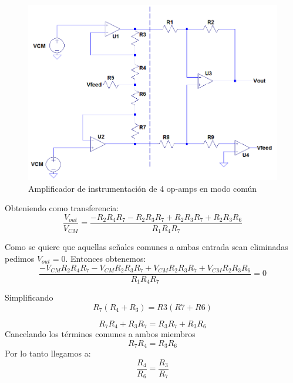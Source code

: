	\begin{figure}[H]
		\centering
		\includegraphics[width=\linewidth]{./ImagenesVarias/inAmpVCM.png}
		\caption{Amplificador de instrumentación de 4 op-amps en modo común}
	\end{figure}
	Obteniendo como transferencia:
	\begin{equation}
		\frac{V_{out}}{V_{CM}}=
		\frac{-R_2 R_4 R_7 - 
			R_2 R_3 R_7 +
			R_2 R_3 R_7+
			R_2 R_3 R_6
		}{R_1 R_4 R_7}
	\end{equation}
		
	Como se quiere que aquellas señales comunes a ambas entrada sean eliminadas pedimos $V_{out}=0$.
	Entonces obtenemos:
		\begin{equation}
		 \frac{-V_{CM} R_2 R_4 R_7 - 
				V_{CM} R_2 R_3 R_7 +
				V_{CM} R_2 R_3 R_7+
				V_{CM} R_2 R_3 R_6
			}{R_1 R_4 R_7} = 0
		\end{equation}
	
	Simplificando
	\begin{equation}
		R_7(R_4+R_3)=R3(R7+R6)
	\end{equation}
	
	\begin{equation}
		R_7R_4+ R_3R_7=R_3R_7+R_3R_6
	\end{equation}
	Cancelando los términos comunes a ambos miembros
	\begin{equation}
		R_7R_4=R_3R_6
	\end{equation}
	Por lo tanto llegamos a:
	\begin{equation}
		\frac{R_4}{R_6}=\frac{R_3}{R_7}  %
	\end{equation}


